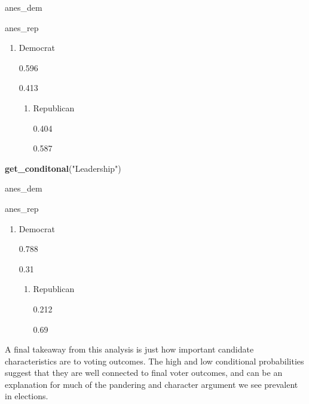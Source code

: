 \documentclass[
]{article}
\newenvironment{Shaded}{\begin{snugshade}}{\end{snugshade}}
\newcommand{\KeywordTok}[1]{\textcolor[rgb]{0.13,0.29,0.53}{\textbf{#1}}}
\newcommand{\NormalTok}[1]{#1}
\newcommand{\StringTok}[1]{\textcolor[rgb]{0.31,0.60,0.02}{#1}}
\providecommand{\tightlist}{%
  \setlength{\itemsep}{0pt}\setlength{\parskip}{0pt}}
\begin{document}
anes\_dem

anes\_rep

\begin{enumerate}
\def\labelenumi{\arabic{enumi}.}
\tightlist
\item
  Democrat

  {0.596}

  {0.413}

  \begin{enumerate}
  \def\labelenumii{\arabic{enumii}.}
  \setcounter{enumii}{1}
  \tightlist
  \item
    Republican

    {0.404}

    {0.587}
  \end{enumerate}
\end{enumerate}

\begin{Shaded}
\begin{Highlighting}[]
\KeywordTok{get_conditonal}\NormalTok{(}\StringTok{"Leadership"}\NormalTok{)}
\end{Highlighting}
\end{Shaded}

anes\_dem

anes\_rep

\begin{enumerate}
\def\labelenumi{\arabic{enumi}.}
\tightlist
\item
  Democrat

  {0.788}

  {0.31}

  \begin{enumerate}
  \def\labelenumii{\arabic{enumii}.}
  \setcounter{enumii}{1}
  \tightlist
  \item
    Republican

    {0.212}

    {0.69}
  \end{enumerate}
\end{enumerate}

A final takeaway from this analysis is just how important candidate
characteristics are to voting outcomes. The high and low conditional
probabilities suggest that they are well connected to final voter
outcomes, and can be an explanation for much of the pandering and
character argument we see prevalent in elections.
\end{document}
